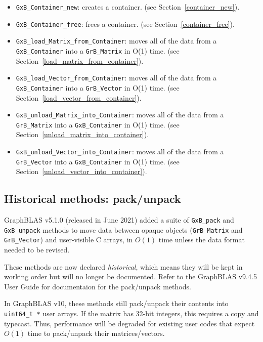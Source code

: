 \begin{itemize}
\item \verb'GxB_Container_new': creates a container.
    (see Section~\ref{container_new}).

\item \verb'GxB_Container_free': frees a container.
    (see Section~\ref{container_free}).

\item \verb'GxB_load_Matrix_from_Container': moves all of the data from a
    \verb'GxB_Container' into a \verb'GrB_Matrix' in O(1) time.
    (see Section~\ref{load_matrix_from_container}).

\item \verb'GxB_load_Vector_from_Container': moves all of the data from a
    \verb'GxB_Container' into a \verb'GrB_Vector' in O(1) time.
    (see Section~\ref{load_vector_from_container}).

\item \verb'GxB_unload_Matrix_into_Container': moves all of the data from
    a \verb'GrB_Matrix' into a \verb'GxB_Container' in O(1) time.
    (see Section~\ref{unload_matrix_into_container}).

\item \verb'GxB_unload_Vector_into_Container': moves all of the data from
    a \verb'GrB_Vector' into a \verb'GxB_Container' in O(1) time.
    (see Section~\ref{unload_vector_into_container}).

\end{itemize}

\subsection{Historical methods: pack/unpack}

GraphBLAS v5.1.0 (released in June 2021) added a suite of \verb'GxB_pack' and
\verb'GxB_unpack' methods to move data between opaque objects
(\verb'GrB_Matrix' and \verb'GrB_Vector') and user-visible C arrays, in $O(1)$
time unless the data format needed to be revised.

These methods are now declared {\em historical}, which means they will be kept
in working order but will no longer be documented.  Refer to the GraphBLAS
v9.4.5 User Guide for documentaion for the pack/unpack methods.

In GraphBLAS v10, these methods still pack/unpack their contents into
\verb'uint64_t *' user arrays.  If the matrix has 32-bit integers, this
requires a copy and typecast.  Thus, performance will be degraded for existing
user codes that expect $O(1)$ time to pack/unpack their matrices/vectors.

